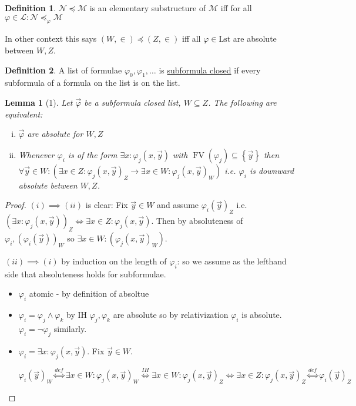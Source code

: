 \documentclass{scrartcl}
\renewcommand{\L}{\mathcal{L}}
\newcommand{\set}[1]{\left\{#1\right\}}
\DeclareMathOperator{\FV}{FV}
\theoremstyle{definition}
\newtheorem*{definition*}{Definition}
\theoremstyle{plain}
\newtheorem*{lemma*}{Lemma}
\theoremstyle{remark}
\begin{document}
	\begin{definition*}
		$\mathcal{N} \preceq \mathcal{M}$ is an elementary substructure of $\mathcal{M}$ iff for all $\varphi \in \L: \mathcal{N} \preceq_\varphi \mathcal{M}$
		
		In other context this says $(W, \in) \preceq (Z, \in)$ iff all $\varphi \in \text{Lst}$ are absolute between $W, Z$. 
	\end{definition*}  

	\begin{definition*}
		A list of formulae $\varphi_0, \varphi_1, \dots$ is \underline{subformula closed} if every subformula of a formula on the list is on the list. 
	\end{definition*}

	\begin{lemma*}[1]
		Let $\vec{\varphi}$ be a subformula closed list, $W \subseteq Z$. The following are equivalent:
		\begin{enumerate}[(i)]
			\item $\vec{\varphi}$ are absolute for $W, Z$
			
			\item Whenever $\varphi_i$ is of the form $\exists x: \varphi_j(x, \vec{y})$ with $\FV(\varphi_j) \subseteq \set{\vec{y}}$ then $\forall \vec{y} \in W: (\exists x \in Z: \varphi_j(x, \vec{y})_Z \longrightarrow \exists x \in W: \varphi_j(x, \vec{y})_W)$ i.e. $\varphi_i$ is downward absolute between $W, Z$.
		\end{enumerate}
	\end{lemma*}

	\begin{proof}
		\underline{$(i) \implies (ii)$} is clear: Fix $\vec{y} \in W$ and assume $\varphi_i(\vec{y})_Z$ i.e. $(\exists x: \varphi_j(x, \vec{y}))_Z \iff \exists x \in Z: \varphi_j(x, \vec{y})$.
		Then by absoluteness of $\varphi_i, (\varphi_i(\vec{y}))_W$ so $\exists x \in W: (\varphi_j(x, \vec{y})_W)$.
		
		\underline{$(ii) \implies (i)$} by induction on the length of $\varphi_i$: so we assume as the lefthand side that absoluteness holds for subformulae.
		\begin{itemize}
			\item $\varphi_i$ atomic - by definition of absoltue
			\item $\varphi_i = \varphi_j \land \varphi_k$ by IH $\varphi_j, \varphi_k$ are absolute so by relativization $\varphi_i$ is absolute. $\varphi_i = \lnot \varphi_j$ similarly.
			\item $\varphi_i = \exists x: \varphi_j(x, \vec{y})$. Fix $\vec{y} \in W$.
			
			$\varphi_i(\vec{y})_W \overset{def}{\iff} \exists x \in W: \varphi_j(x, \vec{y})_W \overset{IH}{\iff} \exists x \in W: \varphi_j(x, \vec{y})_Z \iff \exists x \in Z: \varphi_j(x, \vec{y})_Z
			\overset{def}\iff \varphi_i(\vec{y})_Z$ 
		\end{itemize} 
	\end{proof}
\end{document}
